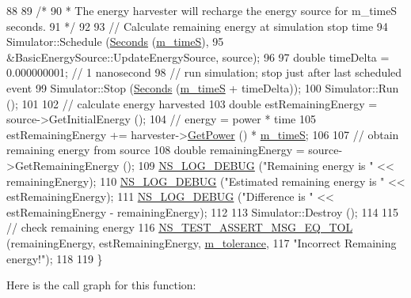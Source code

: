 \begin{DoxyCode}
88 
89   \textcolor{comment}{/*}
90 \textcolor{comment}{         * The energy harvester will recharge the energy source for m\_timeS seconds.}
91 \textcolor{comment}{         */}
92 
93   \textcolor{comment}{// Calculate remaining energy at simulation stop time}
94   Simulator::Schedule (\hyperlink{group__timecivil_ga33c34b816f8ff6628e33d5c8e9713b9e}{Seconds} (\hyperlink{classBasicEnergyHarvesterTestCase_a7fb984119deb87b873e2ca42744ac8d5}{m\_timeS}),
95                        &BasicEnergySource::UpdateEnergySource, source);
96 
97   \textcolor{keywordtype}{double} timeDelta = 0.000000001; \textcolor{comment}{// 1 nanosecond}
98   \textcolor{comment}{// run simulation; stop just after last scheduled event}
99   Simulator::Stop (\hyperlink{group__timecivil_ga33c34b816f8ff6628e33d5c8e9713b9e}{Seconds} (\hyperlink{classBasicEnergyHarvesterTestCase_a7fb984119deb87b873e2ca42744ac8d5}{m\_timeS} + timeDelta));
100   Simulator::Run ();
101 
102   \textcolor{comment}{// calculate energy harvested}
103   \textcolor{keywordtype}{double} estRemainingEnergy = source->GetInitialEnergy ();
104   \textcolor{comment}{// energy = power * time}
105   estRemainingEnergy += harvester->\hyperlink{classns3_1_1EnergyHarvester_a4f4aed7ac81b2e655fcb71980b299c84}{GetPower} () * \hyperlink{classBasicEnergyHarvesterTestCase_a7fb984119deb87b873e2ca42744ac8d5}{m\_timeS};
106 
107   \textcolor{comment}{// obtain remaining energy from source}
108         \textcolor{keywordtype}{double} remainingEnergy = source->GetRemainingEnergy ();
109         \hyperlink{group__logging_ga413f1886406d49f59a6a0a89b77b4d0a}{NS\_LOG\_DEBUG} (\textcolor{stringliteral}{"Remaining energy is "} << remainingEnergy);
110         \hyperlink{group__logging_ga413f1886406d49f59a6a0a89b77b4d0a}{NS\_LOG\_DEBUG} (\textcolor{stringliteral}{"Estimated remaining energy is "} << estRemainingEnergy);
111         \hyperlink{group__logging_ga413f1886406d49f59a6a0a89b77b4d0a}{NS\_LOG\_DEBUG} (\textcolor{stringliteral}{"Difference is "} << estRemainingEnergy - remainingEnergy);
112 
113         Simulator::Destroy ();
114 
115         \textcolor{comment}{// check remaining energy}
116   \hyperlink{group__testing_ga9e7861b56b4e70db3b56044cb7a28e41}{NS\_TEST\_ASSERT\_MSG\_EQ\_TOL} (remainingEnergy, estRemainingEnergy, 
      \hyperlink{classBasicEnergyHarvesterTestCase_ab99eb52f3d30d0a6bd4355bbea80a2a7}{m\_tolerance},
117                              \textcolor{stringliteral}{"Incorrect Remaining energy!"});
118 
119 \}
\end{DoxyCode}


Here is the call graph for this function\+:




